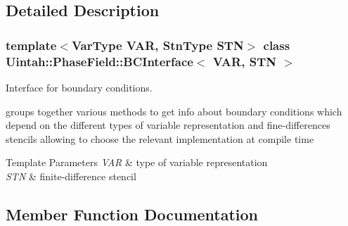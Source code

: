\subsection{Detailed Description}
\subsubsection*{template$<$Var\+Type V\+AR, Stn\+Type S\+TN$>$\newline
class Uintah\+::\+Phase\+Field\+::\+B\+C\+Interface$<$ V\+A\+R, S\+T\+N $>$}

Interface for boundary conditions. 

groups together various methods to get info about boundary conditions which depend on the different types of variable representation and fine-\/differences stencils allowing to choose the relevant implementation at compile time 
\begin{DoxyTemplParams}{Template Parameters}
{\em V\+AR} & type of variable representation \\
\hline
{\em S\+TN} & finite-\/difference stencil \\
\hline
\end{DoxyTemplParams}


\subsection{Member Function Documentation}
\mbox{\label{structUintah_1_1PhaseField_1_1BCInterface_a50bf60e11fabf331dd0f21c28f46c7fc}} 
